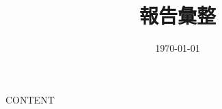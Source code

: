 \documentclass{article}
\title{報告彙整}
\date{\today}
\begin{document}
\maketitle

{{CONTENT}}
\end{document}
